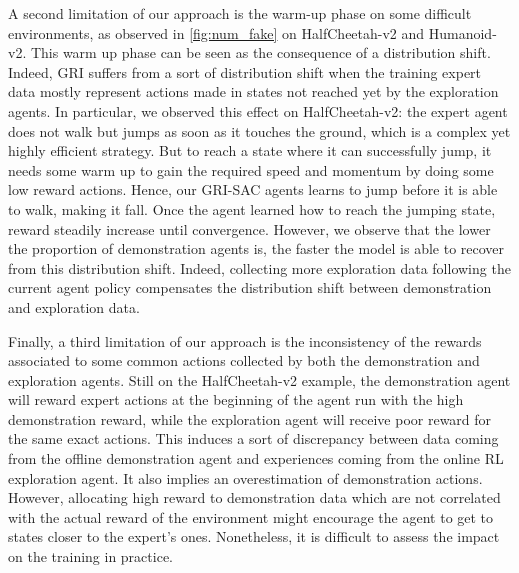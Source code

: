 \documentclass[letterpaper, 10 pt, conference]{ieeeconf}
\begin{document}
A second limitation of our approach is the warm-up phase on some difficult environments, as observed in \cref{fig:num_fake} on HalfCheetah-v2 and Humanoid-v2. This warm up phase can be seen as the consequence of a distribution shift. Indeed, GRI suffers from a sort of distribution shift when the training expert data mostly represent actions made in states not reached yet by the exploration agents. In particular, we observed this effect on HalfCheetah-v2: the expert agent does not walk but jumps as soon as it touches the ground, which is a complex yet highly efficient strategy. But to reach a state where it can successfully jump, it needs some warm up to gain the required speed and momentum by doing some low reward actions. Hence, our GRI-SAC agents learns to jump before it is able to walk, making it fall. Once the agent learned how to reach the jumping state, reward steadily increase until convergence. However, we observe that the lower the proportion of demonstration agents is, the faster the model is able to recover from this distribution shift. Indeed, collecting more exploration data following the current agent policy compensates the distribution shift between demonstration and exploration data. 


Finally, a third limitation of our approach is the inconsistency of the rewards associated to some common actions collected by both the demonstration and exploration agents. Still on the HalfCheetah-v2 example, the demonstration agent will reward expert actions at the beginning of the agent run with the high demonstration reward, while the  exploration agent will receive poor reward for the same exact actions. This induces a sort of discrepancy between data coming from the offline demonstration agent and experiences coming from the online RL exploration agent. It also implies an overestimation of demonstration actions. However, allocating high reward to demonstration data which are not correlated with the actual reward of the environment might encourage the agent to get to states closer to the expert's ones. Nonetheless, it is difficult to assess the impact on the training in practice.
\end{document}
